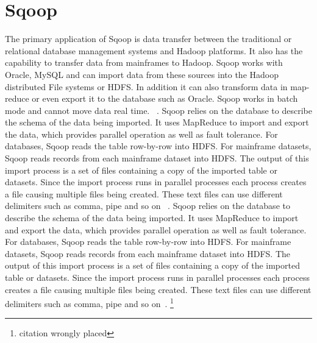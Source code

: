 \section{Sqoop}

The primary application of Sqoop is data transfer between the
traditional or relational database management systems and Hadoop
platforms. It also has the capability to transfer data from mainframes
to Hadoop. Sqoop works with Oracle, MySQL and can import data from
these sources into the Hadoop distributed File systems or HDFS. In
addition it can also transform data in map-reduce or even export it to
the database such as Oracle.  Sqoop works in batch mode and cannot
move data real time.  ~\cite{hid-sp18-517-Sqoop}. Sqoop relies on the
database to describe the schema of the data being imported. It uses
MapReduce to import and export the data, which provides parallel
operation as well as fault tolerance.  For databases, Sqoop reads the
table row-by-row into HDFS.  For mainframe datasets, Sqoop reads
records from each mainframe dataset into HDFS. The output of this
import process is a set of files containing a copy of the imported
table or datasets. Since the import process runs in parallel processes
each process creates a file causing multiple files being
created. These text files can use different delimiters such as comma,
pipe and so on ~\cite{hid-sp18-517-Sqoop}. Sqoop relies on the
database to describe the schema of the data being imported. It uses
MapReduce to import and export the data, which provides parallel
operation as well as fault tolerance.  For databases, Sqoop reads the
table row-by-row into HDFS.  For mainframe datasets, Sqoop reads
records from each mainframe dataset into HDFS. The output of this
import process is a set of files containing a copy of the imported
table or datasets. Since the import process runs in parallel processes
each process creates a file causing multiple files being
created. These text files can use different delimiters such as comma,
pipe and so on~\cite{hid-sp18-517-Sqoop}.
\footnote{citation wrongly placed}